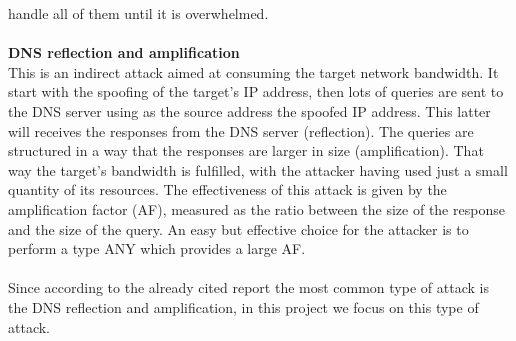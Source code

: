 handle all of them until it is overwhelmed.\\
\\
\textbf{DNS reflection and amplification}\\
This is an indirect attack aimed at consuming the target network bandwidth. It start with the spoofing of the target's IP address, then lots 
of queries are sent to the DNS server using as the source address the spoofed IP address. This latter will receives the responses from the 
DNS server (reflection). The queries are structured in a way that the responses are larger in size (amplification). That way the target's
bandwidth is fulfilled, with the attacker having used just a small quantity of its resources. The effectiveness of this attack is given by 
the amplification factor (AF), measured as the ratio between the size of the response and the size of the query. An easy but effective choice
for the attacker is to perform a type ANY which provides a large AF.\\
\\
Since according to the already cited report \cite{DDoSthreatreport} the most common type of attack is the DNS reflection and amplification,
in this project we focus on this type of attack.


